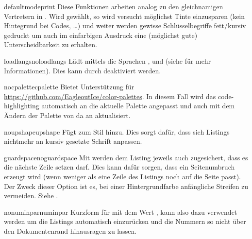 \documentclass{sopra-base}
\begin{document}
    \begin{argument}{defaultmode}{print}
        Diese Funktionen arbeiten analog zu den gleichnamigen Vertretern in . Wird  gewählt, so wird versucht möglichst Tinte einzusparen (kein Hintegrund bei Codes, \ldots) und weiter werden gewisse
        Schlüsselbegriffe fett/kursiv gedruckt um auch im einfarbigen Ausdruck eine 
        (möglichst gute) Unterscheidbarkeit zu erhalten.
    \end{argument}

    \begin{argument}{loadlangs}{noloadlangs}
        Lädt mittels  die Sprachen ,  und  (siehe  für mehr Informationen). Dies kann durch  deaktiviert werden. 
    \end{argument}

    \begin{argument}{nocpalette}{cpalette}
        Bietet Unterstützung für \href{color-palettes}{https://github.com/EagleoutIce/color-palettes}. In diesem Fall wird das code-highlighting automatisch an die aktuelle Palette angepasst und auch mit dem Ändern der Palette von da an aktualisiert.
    \end{argument}
    
    \begin{argument}{noupshape}{upshape}
        Fügt  zum Stil hinzu. Dies sorgt dafür, dass sich Listings nichtmehr an kursiv gesetzte Schrift anpassen.
    \end{argument}

    \begin{argument}{guardspace}{noguardspace}
        Mit  werden dem Listing jeweils auch zugesichert, dass es die nächste Zeile setzen darf. Dies kann dafür sorgen, dass ein Seitenumbruch erzeugt wird (wenn weniger als eine Zeile des Listings noch auf die Seite passt). Der Zweck dieser Option ist es, bei einer Hintergrundfarbe anfängliche Streifen zu vermeiden. Siehe .
    \end{argument}

    \begin{argument}{nonuminpar}{numinpar}
        Kurzform für  mit dem Wert \glqq{}{\makeatletter\@@sol@numinpar@length}\grqq{}, kann also dazu verwendet
        werden um die Listings automatisch einzurücken und die Nummern so nicht über den Dokumentenrand hinausragen zu lassen.
    \end{argument}
\end{document}

